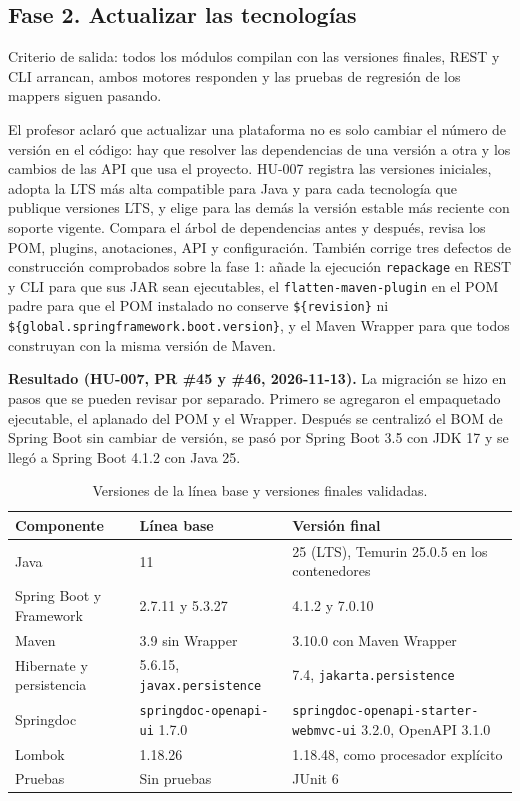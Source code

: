 \documentclass[11pt,a4paper]{article}
\begin{document}
\subsection{Fase 2. Actualizar las tecnologías}
Criterio de salida: todos los módulos compilan con las versiones finales, REST y
CLI arrancan, ambos motores responden y las pruebas de regresión de los mappers
siguen pasando.

El profesor aclaró que actualizar una plataforma no es solo cambiar el número de
versión en el código: hay que resolver las dependencias de una versión a otra y
los cambios de las API que usa el proyecto. HU-007 registra las versiones
iniciales, adopta la LTS más alta compatible para Java y para cada tecnología que
publique versiones LTS, y elige para las demás la versión estable más reciente con
soporte vigente. Compara el árbol de dependencias antes y después, revisa los POM,
plugins, anotaciones, API y configuración. También corrige tres defectos de
construcción comprobados sobre la fase 1: añade la ejecución \texttt{repackage} en
REST y CLI para que sus JAR sean ejecutables, el \texttt{flatten-maven-plugin} en
el POM padre para que el POM instalado no conserve \texttt{\$\{revision\}} ni
\texttt{\$\{global.springframework.boot.version\}}, y el Maven Wrapper para que
todos construyan con la misma versión de Maven.

\textbf{Resultado (HU-007, PR \#45 y \#46, 2026-11-13).} La migración se hizo en
pasos que se pueden revisar por separado. Primero se agregaron el empaquetado
ejecutable, el aplanado del POM y el Wrapper. Después se centralizó el BOM de
Spring Boot sin cambiar de versión, se pasó por Spring Boot 3.5 con JDK 17 y se
llegó a Spring Boot 4.1.2 con Java 25.

\begin{table}[H]
\centering\small
\begin{tabularx}{\textwidth}{@{}p{3.6cm}p{3.6cm}X@{}}
\toprule
\textbf{Componente}&\textbf{Línea base}&\textbf{Versión final}\\\midrule
Java&11&25 (LTS), Temurin 25.0.5 en los contenedores\\
Spring Boot y Framework&2.7.11 y 5.3.27&4.1.2 y 7.0.10\\
Maven&3.9 sin Wrapper&3.10.0 con Maven Wrapper\\
Hibernate y persistencia&5.6.15, \texttt{javax.persistence}&7.4, \texttt{jakarta.persistence}\\
Springdoc&\texttt{springdoc-openapi-ui} 1.7.0&\texttt{springdoc-openapi-starter-webmvc-ui} 3.2.0, OpenAPI 3.1.0\\
Lombok&1.18.26&1.18.48, como procesador explícito\\
Pruebas&Sin pruebas&JUnit 6\\
\bottomrule
\end{tabularx}
\caption{Versiones de la línea base y versiones finales validadas.}
\end{table}
\end{document}
